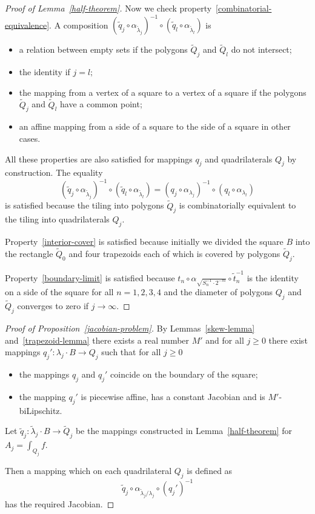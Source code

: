 \documentclass[12pt]{article}
\theoremstyle{definition}
\begin{document}
\begin{proof}[Proof of Lemma~\ref{half-theorem}]
Now we check property~\ref{combinatorial-equivalence}. A composition $\left(\widetilde q_{j}\circ\alpha_{\widetilde\lambda_{j}}\right)^{-1}\circ\left(\widetilde q_{l}\circ\alpha_{\widetilde\lambda_{l}}\right)$ is
\begin{itemize}
\item a relation between empty sets if the polygons $\widetilde Q_j$ and $\widetilde Q_l$ do not intersect;
\item the identity if $j=l;$
\item the mapping from a vertex of a square to a vertex of a square if the polygons $\widetilde Q_j$ and $\widetilde Q_l$ have a common point;
\item an affine mapping from a side of a square to the side of a square in other cases.
\end{itemize}
All these properties are also satisfied for mappings $q_j$ and quadrilaterals $Q_j$ by construction. The equality
$$
\left(\widetilde q_{j}\circ\alpha_{\widetilde\lambda_{j}}\right)^{-1}\circ\left(\widetilde q_{l}\circ\alpha_{\widetilde\lambda_{l}}\right)
=
\left(q_{j}\circ\alpha_{\lambda_{j}}\right)^{-1}\circ\left(q_{l}\circ\alpha_{\lambda_{l}}\right)
$$ 
is satisfied because the tiling into polygons $\widetilde Q_j$ is combinatorially equivalent to the tiling into quadrilaterals $Q_j.$

Property~\ref{interior-cover} is satisfied because initially we divided the square $B$ into the rectangle $\widetilde Q_0$ and four trapezoids each of which is covered by polygons $\widetilde Q_j.$

Property~\ref{boundary-limit} is satisfied because $t_n\circ\alpha_{\sqrt{S_n^{-1}\cdot2^{-m}}}\circ \widetilde t_n^{-1}$ is the identity on a side of the square for all $n=1,2,3,4$ and the diameter of polygons $Q_j$ and $\widetilde Q_j$ converges to zero if $j\to\infty.$
\end{proof}

\begin{proof}[Proof of Proposition~\ref{jacobian-problem}]
By Lemmas~\ref{skew-lemma} and~\ref{trapezoid-lemma} there exists a real number $M'$ and for all $j\ge0$ there exist mappings $q_j':\lambda_j\cdot B\to Q_j$ such that for all $j\ge0$
\begin{itemize}
\item the mappings $q_j$ and $q_j'$ coincide on the boundary of the square;
\item the mapping $q_j'$ is piecewise affine, has a constant Jacobian and is $M'$-biLipschitz.
\end{itemize}

Let $\widetilde q_j:\widetilde\lambda_j\cdot B\to\widetilde Q_j$ be the mappings constructed in Lemma~\ref{half-theorem} for $A_j=\int_{Q_j}f $.

Then a mapping which on each quadrilateral $Q_j$ is defined as
$$
\widetilde q_j\circ\alpha_{\widetilde\lambda_j/\lambda_j}\circ\left(q_j'\right)^{-1}
$$
has the required Jacobian.
\end{proof}
\end{document}
